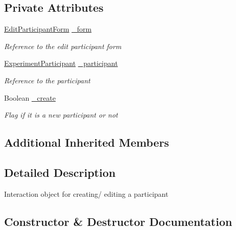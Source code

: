\subsection*{Private Attributes}
\begin{DoxyCompactItemize}
\item 
\hyperlink{class_web_analyzer_1_1_u_i_1_1_edit_participant_form}{Edit\+Participant\+Form} \hyperlink{class_web_analyzer_1_1_u_i_1_1_interaction_objects_1_1_participant_control_ab9a43552c6e7c3b421ddc4d1a4c3dc2b}{\+\_\+form}
\begin{DoxyCompactList}\small\item\em Reference to the edit participant form \end{DoxyCompactList}\item 
\hyperlink{class_web_analyzer_1_1_models_1_1_base_1_1_experiment_participant}{Experiment\+Participant} \hyperlink{class_web_analyzer_1_1_u_i_1_1_interaction_objects_1_1_participant_control_ae7f805fadde2e1d9088c751bc5860b94}{\+\_\+participant}
\begin{DoxyCompactList}\small\item\em Reference to the participant \end{DoxyCompactList}\item 
Boolean \hyperlink{class_web_analyzer_1_1_u_i_1_1_interaction_objects_1_1_participant_control_a9526dab215a152dae475ec8b6098f15d}{\+\_\+create}
\begin{DoxyCompactList}\small\item\em Flag if it is a new participant or not \end{DoxyCompactList}\end{DoxyCompactItemize}
\subsection*{Additional Inherited Members}


\subsection{Detailed Description}
Interaction object for creating/ editing a participant 



\subsection{Constructor \& Destructor Documentation}
\hypertarget{class_web_analyzer_1_1_u_i_1_1_interaction_objects_1_1_participant_control_acbbf6818f36ccddc69c2e0676616a9d9}{}
